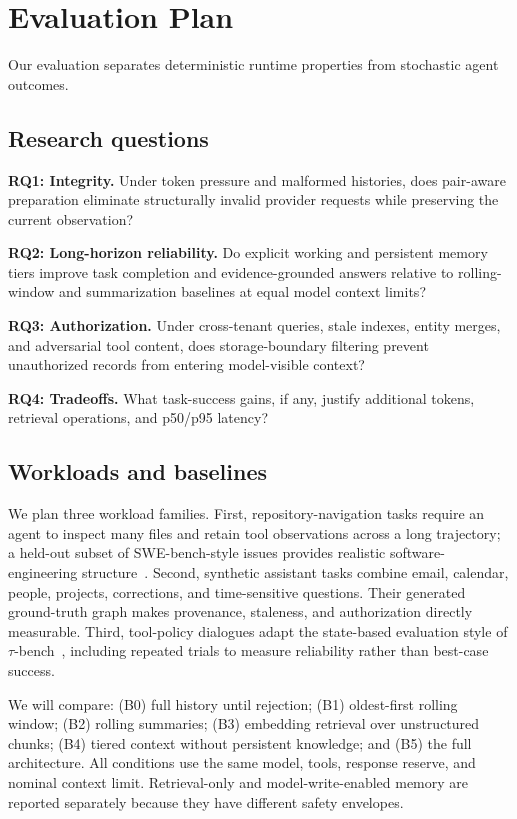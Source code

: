 \documentclass[sigplan,10pt,anonymous,review]{acmart}
\begin{document}
\section{Evaluation Plan}

Our evaluation separates deterministic runtime properties from stochastic
agent outcomes.

\subsection{Research questions}

\textbf{RQ1: Integrity.} Under token pressure and malformed histories, does
pair-aware preparation eliminate structurally invalid provider requests while
preserving the current observation?

\textbf{RQ2: Long-horizon reliability.} Do explicit working and persistent
memory tiers improve task completion and evidence-grounded answers relative to
rolling-window and summarization baselines at equal model context limits?

\textbf{RQ3: Authorization.} Under cross-tenant queries, stale indexes, entity
merges, and adversarial tool content, does storage-boundary filtering prevent
unauthorized records from entering model-visible context?

\textbf{RQ4: Tradeoffs.} What task-success gains, if any, justify additional
tokens, retrieval operations, and p50/p95 latency?

\subsection{Workloads and baselines}

We plan three workload families.  First, repository-navigation tasks require
an agent to inspect many files and retain tool observations across a long
trajectory; a held-out subset of SWE-bench-style issues provides realistic
software-engineering structure~\cite{jimenez2024swebench}.  Second, synthetic
assistant tasks combine email, calendar, people, projects, corrections, and
time-sensitive questions.  Their generated ground-truth graph makes
provenance, staleness, and authorization directly measurable.  Third,
tool-policy dialogues adapt the state-based evaluation style of
$\tau$-bench~\cite{yao2024taubench}, including repeated trials to measure
reliability rather than best-case success.

We will compare: (B0) full history until rejection; (B1) oldest-first rolling
window; (B2) rolling summaries; (B3) embedding retrieval over unstructured
chunks; (B4) tiered context without persistent knowledge; and (B5) the full
architecture.  All conditions use the same model, tools, response reserve,
and nominal context limit.  Retrieval-only and model-write-enabled memory are
reported separately because they have different safety envelopes.
\end{document}
